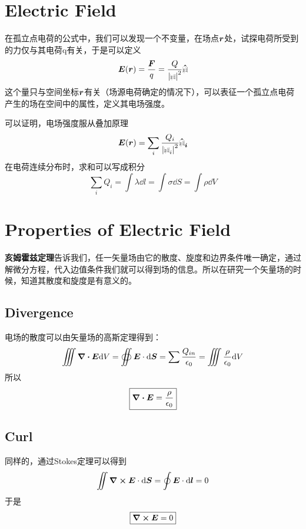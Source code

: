 \documentclass[14pt,oneside]{book}
\def\br{{\mbox{$\resizebox{.09in}{.08in}{\texttt{[image: BoldR]}}$}}}
\newcommand{\hr}{\hat{\br}}
\begin{document}
\begin{large}
\section{Electric Field}
在孤立点电荷的公式中，我们可以发现一个不变量，在场点$\vb*{r}$处，试探电荷所受到的力仅与其电荷q有关，于是可以定义
\begin{equation}
\vb*{E}(\vb*{r})=\frac{\vb*{F}}{q}= \frac{Q}{\abs{\br}^2} \vb*{\hr}
\end{equation}
这个量只与空间坐标$\vb*{r}$有关（场源电荷确定的情况下），可以表征一个孤立点电荷产生的场在空间中的属性，定义其电场强度。

可以证明，电场强度服从叠加原理
\begin{equation}
  \vb*{E}(\vb*{r})=\sum_i \frac{Q_i}{\abs{\br_i}^2} \vb*{\hr_i}
\end{equation}
在电荷连续分布时，求和可以写成积分
\begin{equation}
  \sum_i Q_i=\int \lambda \dd l=\int \sigma \dd S =\int \rho \dd V
\end{equation}
\section{Properties of Electric Field}
\textbf{亥姆霍兹定理}告诉我们，任一矢量场由它的散度、旋度和边界条件唯一确定，通过解微分方程，代入边值条件我们就可以得到场的信息。所以在研究一个矢量场的时候，知道其散度和旋度是有意义的。
\subsection{Divergence}
电场的散度可以由矢量场的高斯定理得到：
\begin{equation}
  \iiint\div{\vb*{E}} \dd V=\oiint \vb*{E}\cdot\dd \vb*{S} =\sum \frac{Q_{in}}{\epsilon_0}=\iiint\frac{\rho}{\epsilon_0}\dd V
\end{equation}
所以
\begin{equation}
  \boxed{\div{\vb*{E}}=\frac{\rho}{\epsilon_0}}
\end{equation}
\subsection{Curl}
同样的，通过Stokes定理可以得到
\begin{equation}
  \iint \curl{\vb*{E}}\cdot\dd \vb*{S}=\oint \vb*{E}\cdot\dd \vb*{l}=0
\end{equation}
于是
\begin{equation}
 \boxed{ \curl{\vb*{E}}=0}
\end{equation}


\end{large}
\end{document}
